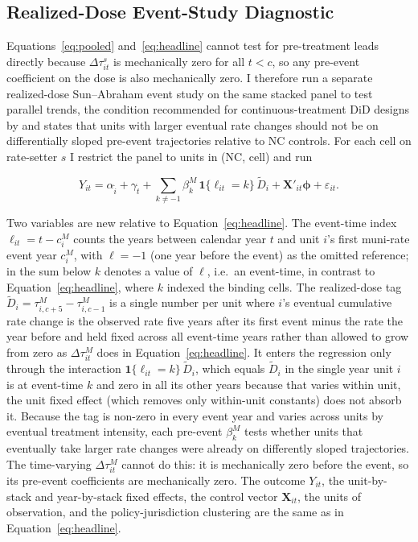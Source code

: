 \documentclass[12pt]{article}
\begin{document}
\subsection{Realized-Dose Event-Study Diagnostic}
\label{subsec:pretrend-diagnostics}
\label{subsec:realized-dose-es}

Equations~\ref{eq:pooled} and~\ref{eq:headline}  cannot test for pre-treatment leads
directly because $\Delta\tau^s_{it}$ is mechanically zero for all
$t < c$, so any pre-event coefficient on the dose
is also mechanically zero. I therefore run a separate
realized-dose Sun--Abraham event study on the same stacked panel
to test parallel trends, the condition recommended
for continuous-treatment DiD designs by
\citet{callaway2021} and
\citet{dechaisemartin2024} states that units with
larger eventual rate changes should not be on differentially sloped
pre-event trajectories relative to NC controls. For each cell on
rate-setter $s$ I restrict the panel to units in (NC, cell) and
run

\begin{equation}
Y_{it} = \alpha_{\tilde i} + \gamma_{\tilde t}
+ \sum_{k \neq -1} \beta^M_k\, \mathbf{1}\{\ell_{it} = k\}\,
\widetilde{D}_i
+ \mathbf{X}'_{it}\boldsymbol{\phi} + \varepsilon_{it}.
\label{eq:realized-dose-es}
\end{equation}

Two variables are new relative to Equation~\ref{eq:headline}. The
event-time index $\ell_{it} = t - c^M_i$ counts the years between
calendar year $t$ and unit $i$'s first muni-rate event year $c^M_i$,
with $\ell = -1$ (one year before the event) as the omitted
reference; in the sum below $k$ denotes a value of $\ell$, i.e.\ an
event-time, in contrast to Equation~\ref{eq:headline}, where $k$
indexed the binding cells. The realized-dose tag
$\widetilde{D}_i = \tau^M_{i, c+5} - \tau^M_{i, c-1}$ is a single number per unit where $i$'s eventual cumulative rate
change is the observed rate five years after its first event minus the
rate the year before and held fixed across all event-time years rather
than allowed to grow from zero as $\Delta\tau^M_{it}$ does in
Equation~\ref{eq:headline}. It enters the regression only through the
interaction $\mathbf{1}\{\ell_{it}=k\}\,\widetilde{D}_i$, which equals
$\widetilde{D}_i$ in the single year unit $i$ is at event-time $k$ and
zero in all its other years because that varies within unit, the
unit fixed effect (which removes only within-unit constants) does not
absorb it. Because the tag is non-zero in every event year and varies across units by eventual treatment
intensity, each pre-event $\beta^M_k$ tests whether units that
eventually take larger rate changes were already on differently sloped
trajectories. The time-varying $\Delta\tau^M_{it}$ cannot do this: it
is mechanically zero before the event, so its pre-event coefficients
are mechanically zero. The outcome $Y_{it}$, the unit-by-stack and year-by-stack
fixed effects, the control vector $\mathbf{X}_{it}$, the units of
observation, and the policy-jurisdiction clustering are the same
as in Equation~\ref{eq:headline}.
\end{document}
